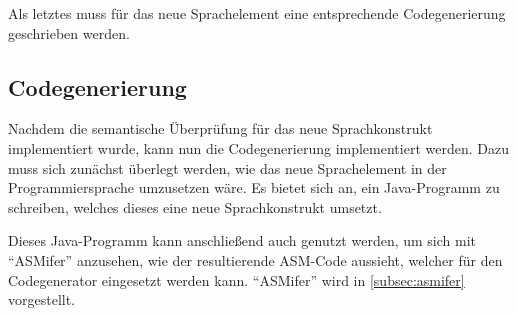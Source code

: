 Als letztes muss für das neue Sprachelement eine entsprechende Codegenerierung geschrieben werden.

\subsection{Codegenerierung}
Nachdem die semantische Überprüfung für das neue Sprachkonstrukt implementiert wurde, kann nun die Codegenerierung implementiert werden. Dazu muss sich zunächst überlegt werden, wie das neue Sprachelement in der Programmiersprache umzusetzen wäre. Es bietet sich an, ein Java-Programm zu schreiben, welches dieses eine neue Sprachkonstrukt umsetzt.

Dieses Java-Programm kann anschließend auch genutzt werden, um sich mit \enquote{ASMifer} anzusehen, wie der resultierende ASM-Code aussieht, welcher für den Codegenerator eingesetzt werden kann. \enquote{ASMifer} wird in \cref{subsec:asmifer} vorgestellt.
